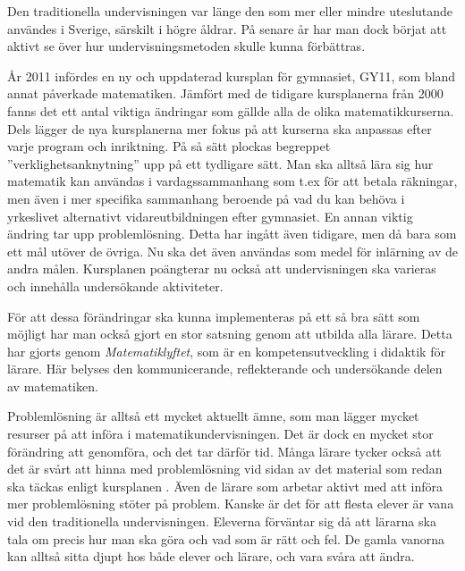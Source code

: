 
\textcolor{lila}{Den traditionella undervisningen var länge den som mer eller mindre uteslutande användes i Sverige, särskilt i högre åldrar. På senare år har man dock börjat att aktivt se över hur undervisningsmetoden skulle kunna förbättras.}

\textcolor{lila}{År 2011 infördes en ny och uppdaterad kursplan för gymnasiet, GY11, som bland annat påverkade matematiken. Jämfört med de tidigare kursplanerna från 2000 fanns det ett antal viktiga ändringar som gällde alla de olika matematikkurserna. %
Dels lägger de nya kursplanerna mer fokus på att kurserna ska anpassas efter varje program och inriktning. På så sätt plockas begreppet ''verklighetsanknytning'' upp på ett tydligare sätt. Man ska alltså lära sig hur matematik kan användas i vardagssammanhang som t.ex för att betala räkningar, men även i mer specifika sammanhang beroende på vad du kan behöva i yrkeslivet alternativt vidareutbildningen efter gymnasiet. 
En annan viktig ändring tar upp problemlösning. Detta har ingått även tidigare, men då bara som ett mål utöver de övriga. Nu ska det även användas som medel för inlärning av de andra målen. Kursplanen poängterar nu också att undervisningen ska varieras och innehålla undersökande aktiviteter. \cite{GY00-GY11}}

\textcolor{lila}{För att dessa förändringar ska kunna implementeras på ett så bra sätt som möjligt har man också gjort en stor satsning genom att utbilda alla lärare. Detta har gjorts genom \textsl{Matematiklyftet}, som är en kompetensutveckling i didaktik för lärare. Här belyses den kommunicerande, reflekterande och undersökande delen av matematiken. \cite{Nämnaren}}
            
\textcolor{lila}{Problemlösning är alltså ett mycket aktuellt ämne, som man lägger mycket resurser på att införa i matematikundervisningen. Det är dock en mycket stor förändring att genomföra, och det tar därför tid. Många lärare tycker också att det är svårt att hinna med problemlösning vid sidan av det material som redan ska täckas enligt kursplanen \cite{2016Senare}. Även de lärare som arbetar aktivt med att införa mer problemlösning stöter på problem. Kanske är det för att flesta elever är vana vid den traditionella undervisningen. Eleverna förväntar sig då att lärarna ska tala om precis hur man ska göra och vad som är rätt och fel. De gamla vanorna kan alltså sitta djupt hos både elever och lärare, och vara svåra att ändra.}


